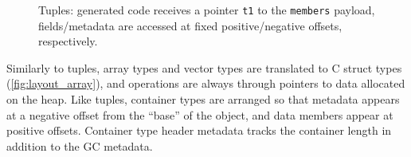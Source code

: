\begin{figure}[H]
\begin{minipage}[c]{0.50\textwidth}
  \end{minipage}
  \caption{Tuples: generated code receives a pointer \texttt{t1} to the
    \texttt{members} payload, fields/metadata are accessed at fixed
    positive/negative offsets, respectively.}
  \label{fig:layout_tuple}
\end{figure}

Similarly to tuples, array types and vector types are translated to C struct
types (\cref{fig:layout_array}), and operations are always through pointers to
data allocated on the heap. Like tuples, container types are arranged so that
metadata appears at a negative offset from the ``base'' of the object, and data
members appear at positive offsets. Container type header metadata tracks the
container length in addition to the GC metadata.

